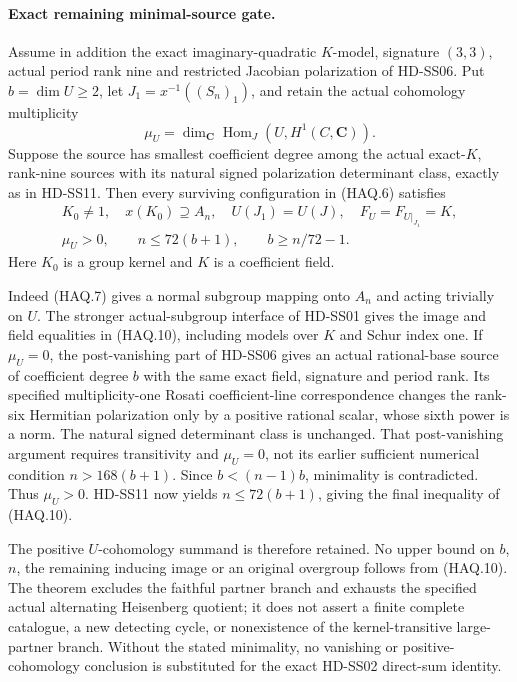 \paragraph{Exact remaining minimal-source gate.}
Assume in addition the exact imaginary-quadratic $K$-model,
signature $(3,3)$, actual period rank nine and restricted Jacobian
polarization of HD-SS06. Put $b=\dim U\ge2$, let
$J_1=x^{-1}((S_n)_1)$, and retain the actual cohomology multiplicity
\[
 \mu_U=\dim_{\mathbf C}
          \operatorname{Hom}_J(U,H^1(C,\mathbf C)).
 \tag{HAQ.9}
\]
Suppose the source has smallest coefficient degree among the actual
exact-$K$, rank-nine sources with its natural signed polarization
determinant class, exactly as in HD-SS11. Then every surviving
configuration in (HAQ.6) satisfies
\[
 \begin{gathered}
 K_0\ne1,\quad x(K_0)\supseteq A_n,\quad
 U(J_1)=U(J),\quad F_U=F_{U|_{J_1}}=K,\\
                         \mu_U>0,\qquad
                 n\le72(b+1),\qquad b\ge n/72-1.
 \end{gathered}
 \tag{HAQ.10}
\]
Here $K_0$ is a group kernel and $K$ is a coefficient field.

Indeed (HAQ.7) gives a normal subgroup mapping onto $A_n$ and
acting trivially on $U$. The stronger actual-subgroup interface of
HD-SS01 gives the image and field equalities in (HAQ.10), including
models over $K$ and Schur index one. If $\mu_U=0$, the post-vanishing
part of HD-SS06 gives an actual rational-base source of coefficient
degree $b$ with the same exact field, signature and period rank.
Its specified multiplicity-one Rosati coefficient-line correspondence
changes the rank-six Hermitian polarization only by a positive
rational scalar, whose sixth power is a norm. The natural signed
determinant class is unchanged. That post-vanishing argument requires
transitivity and $\mu_U=0$, not its earlier sufficient numerical
condition $n>168(b+1)$. Since $b<(n-1)b$, minimality is contradicted.
Thus $\mu_U>0$. HD-SS11 now yields $n\le72(b+1)$, giving the final
inequality of (HAQ.10).

The positive $U$-cohomology summand is therefore retained. No upper
bound on $b$, $n$, the remaining inducing image or an original
overgroup follows from (HAQ.10). The theorem excludes the faithful
partner branch and exhausts the specified actual alternating
Heisenberg quotient; it does not assert a finite complete catalogue,
a new detecting cycle, or nonexistence of the kernel-transitive
large-partner branch. Without the stated minimality, no vanishing or
positive-cohomology conclusion is substituted for the exact HD-SS02
direct-sum identity.
